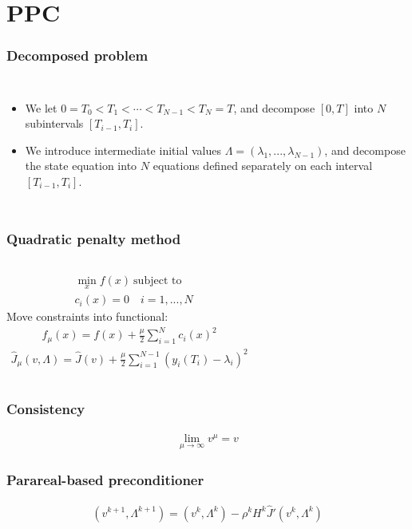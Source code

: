 \documentclass[9pt]{beamer}
\begin{document}
\section{PPC}
\begin{frame}
\frametitle{Decomposed problem}
\begin{columns}
\begin{itemize}
\item{We let $0=T_0<T_1<\cdots<T_{N-1}<T_N=T$, and decompose $[0,T]$ into $N$ subintervals $[T_{i-1},T_i]$. }
\item{We introduce intermediate initial values $\Lambda=(\lambda_1,...,\lambda_{N-1})$, and decompose the state equation into $N$ equations defined separately on each interval $[T_{i-1},T_i]$.}
\end{itemize}
\end{columns}
\end{frame}
\begin{frame}
\frametitle{Quadratic penalty method}
\begin{columns}
\centering
\begin{align*}
&\min_x f(x) \ \textrm{subject to} \\ &c_i(x)=0 \quad i=1,...,N
\end{align*}
Move constraints into functional:
\begin{align*}
f_{\mu}(x) = f(x) + \frac{\mu }{2}\sum_{i=1}^N c_i(x)^2 
\end{align*}
\begin{align*}
\hat{J}_{\mu}(v,\Lambda) = \hat{J}(v) + \frac{\mu}{2}\sum_{i=1}^{N-1}(y_{i}(T_i)-\lambda_i)^2
\end{align*}
\end{columns}
\end{frame}
\begin{frame}
\frametitle{Consistency}
\begin{align*}
\lim_{\mu\rightarrow\infty} v^{\mu}=v
\end{align*}
\end{frame}
\begin{frame}
\frametitle{Parareal-based preconditioner}
\begin{align*}
(v^{k+1},\Lambda^{k+1}) = (v^k,\Lambda^k) - \rho^kH^k \hat J'(v^k,\Lambda^k)
\end{align*}
\end{frame}
\end{document}
